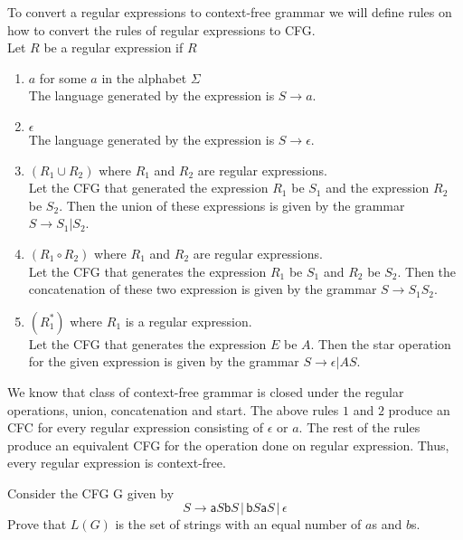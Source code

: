 \documentclass[12pt]{exam}
\begin{document}
\begin{questions}
  \begin{solution}
    To convert a regular expressions to context-free grammar we will define rules on how to convert the rules of regular expressions to CFG.\\
    Let $R$ be a regular expression if $R$
    \begin{enumerate}
      \item $a$ for some $a$ in the alphabet $\Sigma$\\
            The language generated by the expression is $S\to a$.
      \item $\epsilon$\\
            The language generated by the expression is $S\to \epsilon$.
      \item $(R_{1}\cup R_{2})$ where $R_{1}$ and $R_{2}$ are regular expressions.\\
            Let the CFG that generated the expression $R_{1}$ be $S_{1}$ and the expression $R_{2}$ be $S_{2}$. Then the union of these expressions is given by the grammar $S\to S_{1}|S_{2}$.
      \item $(R_{1} \circ R_{2})$ where $R_{1}$ and $R_{2}$ are regular expressions.\\
            Let the CFG that generates the expression $R_{1}$ be $S_{1}$ and $R_{2}$ be $S_{2}$. Then the concatenation of these two expression is given by the grammar $S\to S_{1}S_{2}$.
      \item $(R_{1}^{*})$ where $R_{1}$ is a regular expression.\\
            Let the CFG that generates the expression $E$ be $A$. Then the star operation for the given expression is given by the grammar $S\to \epsilon|AS$.
    \end{enumerate}

    We know that class of context-free grammar is closed under the regular operations, union, concatenation and start.
    The above rules $1$ and $2$ produce an CFC for every regular expression consisting of $\epsilon$ or $a$.
    The rest of the rules produce an equivalent CFG for the operation done on regular expression.
    Thus, every regular expression is context-free.


  \end{solution}

  \question{} Consider the CFG G given by
  \[S\to \mathsf{a}S\mathsf{b}S\,|\,\mathsf{b}S\mathsf{a}S\,|\,\epsilon\]
  Prove that $L(G)$ is the set of strings with an equal number of $a$s and $b$s.


\end{questions}
\end{document}
